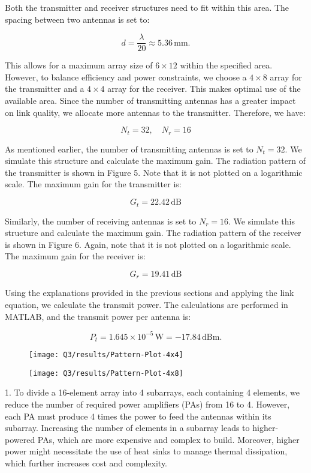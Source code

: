 \documentclass[12pt,onecolumn,a4paper]{article}
\begin{document}
Both the transmitter and receiver structures need to fit within this area. The spacing between two antennas is set to:

\[
d = \frac{\lambda}{20} \approx 5.36 \, \text{mm}.
\]

This allows for a maximum array size of \(6 \times 12\) within the specified area. However, to balance efficiency and power constraints, we choose a \(4 \times 8\) array for the transmitter and a \(4 \times 4\) array for the receiver. This makes optimal use of the available area. Since the number of transmitting antennas has a greater impact on link quality, we allocate more antennas to the transmitter. Therefore, we have:

\[
N_t = 32, \quad N_r = 16 
\]



As mentioned earlier, the number of transmitting antennas is set to \(N_t = 32\). We simulate this structure and calculate the maximum gain. The radiation pattern of the transmitter is shown in Figure 5. Note that it is not plotted on a logarithmic scale. The maximum gain for the transmitter is:

\[
G_t = 22.42 \, \text{dB} 
\]



Similarly, the number of receiving antennas is set to \(N_r = 16\). We simulate this structure and calculate the maximum gain. The radiation pattern of the receiver is shown in Figure 6. Again, note that it is not plotted on a logarithmic scale. The maximum gain for the receiver is:

\[
G_r = 19.41 \, \text{dB} 
\]


Using the explanations provided in the previous sections and applying the link equation, we calculate the transmit power. The calculations are performed in MATLAB, and the transmit power per antenna is:

\[
P_t = 1.645 \times 10^{-5} \, \text{W} = -17.84 \, \text{dBm}.
\]


\begin{figure}[H]
	\centering
	\texttt{[image: Q3/results/Pattern-Plot-4x4]}
	\caption{}
	\label{fig:pattern-plot-4x4}
\end{figure}
\begin{figure}[H]
	\centering
	\texttt{[image: Q3/results/Pattern-Plot-4x8]}
	\caption{}
	\label{fig:pattern-plot-4x8}
\end{figure}



1. To divide a 16-element array into 4 subarrays, each containing 4 elements, we reduce the number of required power amplifiers (PAs) from 16 to 4. However, each PA must produce 4 times the power to feed the antennas within its subarray. Increasing the number of elements in a subarray leads to higher-powered PAs, which are more expensive and complex to build. Moreover, higher power might necessitate the use of heat sinks to manage thermal dissipation, which further increases cost and complexity.
\end{document}
